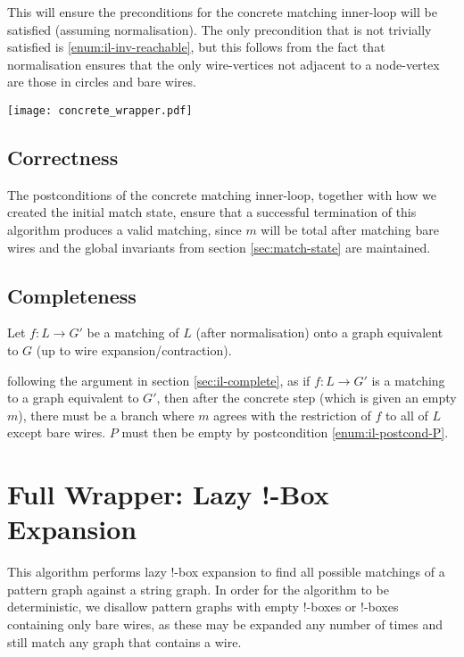 \documentclass{article}
\begin{document}
This will ensure the preconditions for the concrete matching inner-loop will be satisfied (assuming normalisation).  The only precondition that is not trivially satisfied is \ref{enum:il-inv-reachable}, but this follows from the fact that normalisation ensures that the only wire-vertices not adjacent to a node-vertex are those in circles and bare wires.

\begin{center}
  \texttt{[image: concrete\_wrapper.pdf]}
\end{center}

\subsection{Correctness}

The postconditions of the concrete matching inner-loop, together with how we created the initial match state, ensure that a successful termination of this algorithm produces a valid matching, since $m$ will be total after matching bare wires and the global invariants from section \ref{sec:match-state} are maintained.

\subsection{Completeness}

Let $f:L \rightarrow G'$ be a matching of $L$ (after normalisation) onto a graph equivalent to $G$ (up to wire expansion/contraction).

following the argument in section \ref{sec:il-complete}, as if $f:L \rightarrow G'$ is a matching to a graph equivalent to $G'$, then after the concrete step (which is given an empty $m$), there must be a branch where $m$ agrees with the restriction of $f$ to all of $L$ except bare wires.  $P$ must then be empty by postcondition \ref{enum:il-postcond-P}.

\section{Full Wrapper: Lazy !-Box Expansion}
\label{sec:full-wrapper}

This algorithm performs lazy $!$-box expansion to find all possible matchings of a pattern graph against a string graph.  In order for the algorithm to be deterministic, we disallow pattern graphs with empty $!$-boxes or $!$-boxes containing only bare wires, as these may be expanded any number of times and still match any graph that contains a wire.
\end{document}
